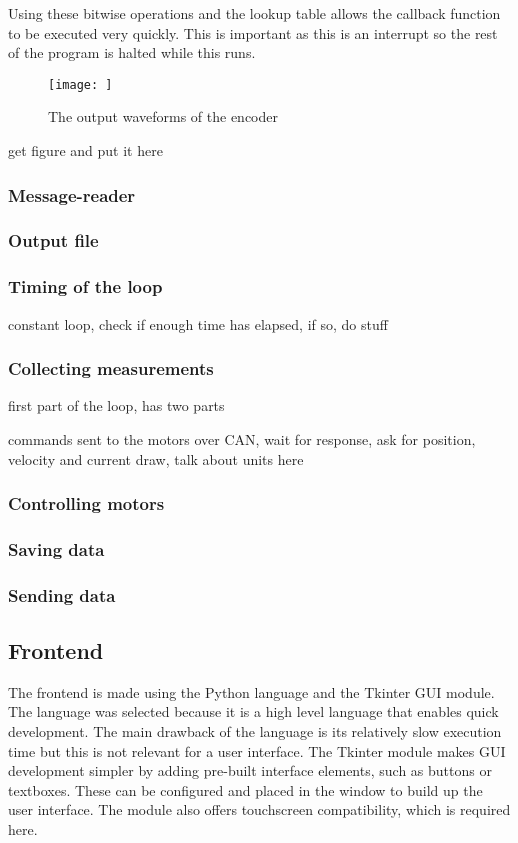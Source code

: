 \documentclass[12pt]{article}
\begin{document}
Using these bitwise operations and the lookup table allows the callback function to be executed very quickly. This is important as this is an interrupt so the rest of the program is halted while this runs.




\begin{figure}
    \centering
    \texttt{[image: ]}
    \caption{The output waveforms of the encoder}
    \label{fig:encoder}
\end{figure}
\TODO get figure and put it here


\subsubsection{Message-reader}
\subsubsection{Output file}



\subsubsection{Timing of the loop}
constant loop, check if enough time has elapsed, if so, do stuff

\subsubsection{Collecting measurements}
first part of the loop, has two parts

commands sent to the motors over CAN, wait for response, ask for position, velocity and current draw, talk about units here



\subsubsection{Controlling motors}
\subsubsection{Saving data}
\subsubsection{Sending data}


\subsection{Frontend}
The frontend is made using the Python language and the Tkinter GUI module. The language was selected because it is a high level language that enables quick development. The main drawback of the language is its relatively slow execution time but this is not relevant for a user interface. The Tkinter module makes GUI development simpler by adding pre-built interface elements, such as buttons or textboxes. These can be configured and placed in the window to build up the user interface. The module also offers touchscreen compatibility, which is required here. 
\end{document}
